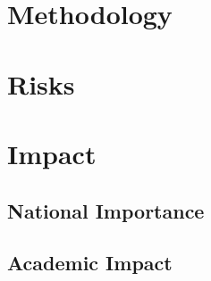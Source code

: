\section{Methodology}
\label{sec:methodology}








\section{Risks}
\label{sec:risks}



\section{Impact}
\label{sec:proposed_approach}


\subsection*{National Importance}
\label{sec:national_importance}

\subsection*{Academic Impact}
\label{sec:academic_impact}



\let\oldbibliography\thebibliography
\renewcommand{\thebibliography}[1]{\oldbibliography{#1}
\setlength{\itemsep}{-3pt}}


{
\scriptsize

}

